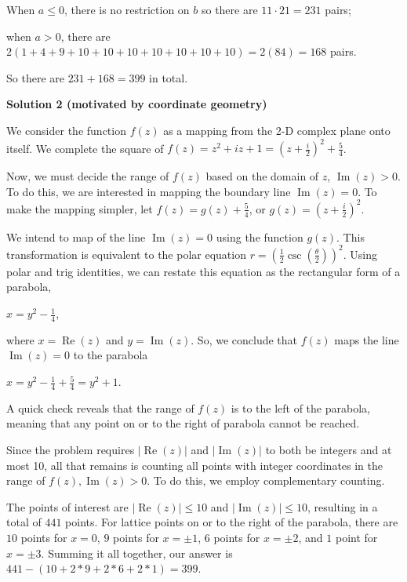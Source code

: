 \begin{enumerate}
 When $a\leq 0$, there is no restriction on $b$ so there are $11\cdot 21 = 231$ pairs;

 when $a > 0$, there are $2(1+4+9+10+10+10+10+10+10+10)=2(84)=168$ pairs.

 So there are $231+168=\boxed{399}$ in total.

 



\textbf{Solution 2 (motivated by coordinate geometry)}

We consider the function $f(z)$ as a mapping from the 2-D complex plane onto itself. We complete the square of $f(z)=z^2+iz+1=(z+\frac{i}{2})^2+\frac{5}{4}$.

 Now, we must decide the range of $f(z)$ based on the domain of $z$, $\operatorname{Im}(z)>0$. To do this, we are interested in mapping the boundary line $\operatorname{Im}(z)=0$. To make the mapping simpler, let $f(z)=g(z)+\frac{5}{4}$, or $g(z)=(z+\frac{i}{2})^2$.

 We intend to map of the line $\operatorname{Im}(z)=0$ using the function $g(z)$. This transformation is equivalent to the polar equation $r=(\frac{1}{2}\csc(\frac{\theta}{2}))^2$. Using polar and trig identities, we can restate this equation as the rectangular form of a parabola,

 $x=y^2-\frac{1}{4}$,

 where $x=\operatorname{Re}(z)$ and $y=\operatorname{Im}(z)$. So, we conclude that $f(z)$ maps the line $\operatorname{Im}(z)=0$ to the parabola 

 $x=y^2-\frac{1}{4}+\frac{5}{4}=y^2+1$.

 A quick check reveals that the range of $f(z)$ is to the left of the parabola, meaning that any point on or to the right of parabola cannot be reached.

 Since the problem requires $|\operatorname{Re}(z)|$ and $|\operatorname{Im}(z)|$ to both be integers and at most 10, all that remains is counting all points with integer coordinates in the range of $f(z), \operatorname{Im}(z)>0$. To do this, we employ complementary counting.

 The points of interest are $|\operatorname{Re}(z)|\leq 10$ and $|\operatorname{Im}(z)|\leq 10$, resulting in a total of $441$ points. For lattice points on or to the right of the parabola, there are $10$ points for $x=0$, $9$ points for $x=\pm 1$, $6$ points for $x=\pm 2$, and $1$ point for $x=\pm 3$. Summing it all together, our answer is $441-(10+2*9+2*6+2*1)=\boxed{399}$.


\end{enumerate}
